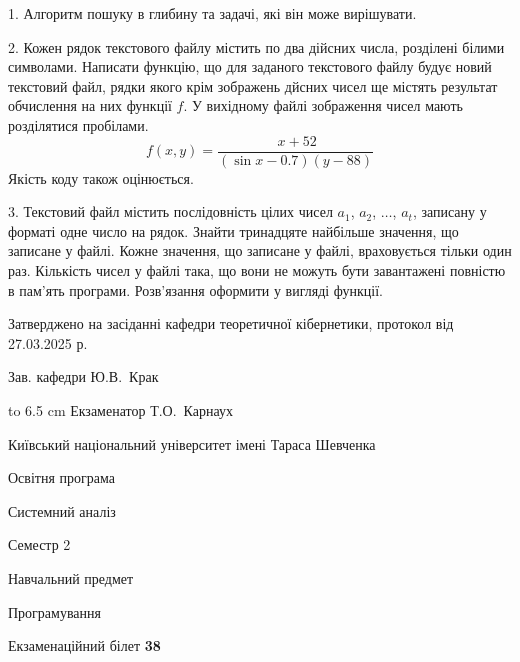 \documentclass[12pt, ukrainian]{article}
\begin{document}
{%
1. Алгоритм пошуку в глибину та задачі, які він може вирішувати.%
\par
\vspace{2mm}

2. Кожен рядок текстового файлу містить по два дійсних числа, розділені білими символами.
Написати функцію, що для заданого текстового файлу будує новий текстовий файл, рядки якого крім зображень дйсних чисел ще містять результат обчислення на них функції $f$. У вихідному файлі зображення чисел мають розділятися пробілами. 
$$f(x, y) =\frac{\ x + 52}{(\sin x - 0.7) (y - 88)}$$ 
Якість коду також оцінюється.

\par
\vspace{2mm}

3. Текстовий файл містить послідовність цілих чисел $a_1$, $a_2$, $\ldots$, $a_t$, записану у форматі одне число на рядок. Знайти тринадцяте найбільше значення, що записане у файлі. Кожне значення, що записане у файлі, враховується тільки один раз. Кількість чисел у файлі така, що вони не можуть бути завантажені повністю в пам'ять програми. Розв'язання оформити у вигляді функції.

}
{\smallskip\smallskip \begin {scriptsize} Затверджено на засіданні кафедри теоретичної кібернетики, протокол   від   27.03.2025 р.\par\smallskip\smallskip\smallskip\smallskip
{\parbox {6.5 cm} {Зав. кафедри \dotfill Ю.В.~Крак}}\hspace {0.7cm} {\hbox to 6.5 cm { Екзаменатор \dotfill Т.О.~Карнаух}} \end{scriptsize}}
\vspace{2.9cm}
{{\begin {scriptsize}\par
{ \center  Київський національний університет імені Тараса Шевченка \par}
{\parbox {5 cm}{Освітня програма \hfill}{\parbox {7 cm}{Системний аналіз\hfill}}\parbox {6 cm}{\hfill Семестр 2}}\par
{\parbox {5 cm} {Навчальний предмет \hfill}\parbox {7 cm}{Програмування \hfill}\parbox {6cm}{\hfill}\par}\vspace{-15pt} \end{scriptsize}}{\center Екзаменаційний білет \No \textbf { 38 }\par}}
\end{document}
